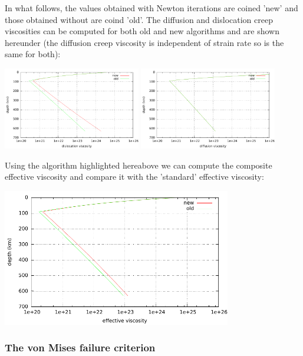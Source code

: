 In what follows, the values obtained with Newton iterations are coined 'new'
and those obtained without are coind 'old'.
The diffusion and dislocation creep viscosities can be
computed for both old and new algorithms and are shown hereunder
(the diffusion creep viscosity is independent of strain rate so
is the same for both):
\begin{center}
\includegraphics[width=6cm]{images/rheology/effvisc/both_mu_ds.pdf}
\includegraphics[width=6cm]{images/rheology/effvisc/both_mu_df.pdf}
\end{center}

Using the algorithm highlighted hereabove we can compute the
composite effective viscosity and compare it with the 'standard'
effective viscosity:
\begin{center}
\includegraphics[width=10cm]{images/rheology/effvisc/both_mueff.pdf}
\end{center}


\subsubsection{The von Mises failure criterion}


